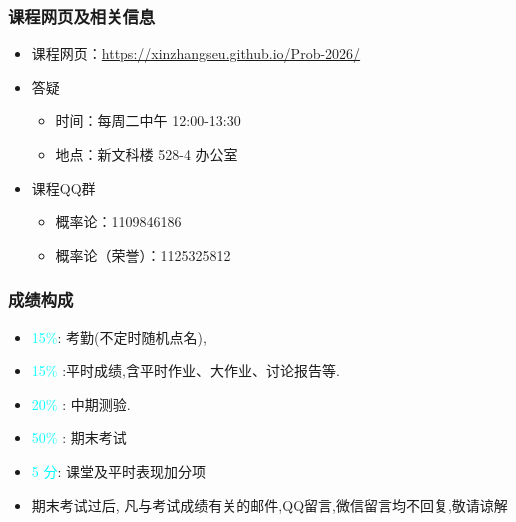 \documentclass[Prob-All.tex]{subfiles}
\begin{document}
\begin{frame}
	\frametitle{课程网页及相关信息}
	\begin{itemize}[<+-|alert@+>]
		\item 课程网页：\href{https://xinzhangseu.github.io/Prob-2026/}{\url{https://xinzhangseu.github.io/Prob-2026/}}
		\item 答疑
		\begin{itemize}[<+-|alert@+>]
			\item 时间：每周二中午 12:00-13:30
			\item 地点：新文科楼 528-4 办公室
		\end{itemize}
		\item 课程{\rm QQ}群
		\begin{itemize}[<+-|alert@+>]
			\item 概率论：1109846186
			\item 概率论（荣誉）：1125325812
			\end{itemize}
	\end{itemize}
\end{frame}


\begin{frame}
	\frametitle{成绩构成}
	\begin{itemize}[<+-|alert@+>]
		\item {\rm  \textcolor{cyan}{15\%}}: 考勤(不定时随机点名), 
		\item {\rm  \textcolor{cyan}{15\%}} :平时成绩,含平时作业、大作业、讨论报告等.
		\item  {\rm  \textcolor{cyan}{20\%}}  : 中期测验.
		\item  {\rm  \textcolor{cyan}{50\%}} : 期末考试
		\item \textcolor{cyan}{5 分}: 课堂及平时表现加分项
		\item 期末考试过后, 凡与考试成绩有关的邮件,QQ留言,微信留言均不回复,敬请谅解
	\end{itemize}
\end{frame}
\end{document}
